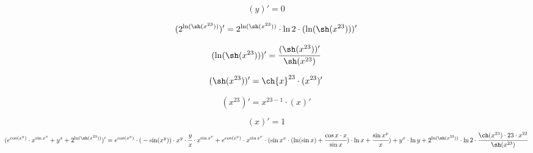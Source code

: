

\begin{dmath}
( y )' = 0
\end{dmath}




\begin{dmath}
({ 2 } ^ { \ln ( \sh ({ x } ^ { 23 }))})' = { 2 } ^ { \ln ( \sh ({ x } ^ { 23 }))} \cdot  \ln  2  \cdot ( \ln ( \sh ({ x } ^ { 23 })))'
\end{dmath}




\begin{dmath}
( \ln ( \sh ({ x } ^ { 23 })))' =  \cfrac {( \sh ({ x } ^ { 23 }))'}{ \sh ({ x } ^ { 23 })}
\end{dmath}




\begin{dmath}
( \sh ({ x } ^ { 23 }))' =  \ch { x } ^ { 23 } \cdot ({ x } ^ { 23 })'
\end{dmath}




\begin{dmath}
({ x } ^ { 23 })' = { x  ^ { 23  - 1} \cdot ( x )'}
\end{dmath}




\begin{dmath}
( x )' = 1
\end{dmath}
\begin{dmath}
({{{{ e } ^ { \cos ({ x } ^ { y })}} \cdot {{ x } ^ {{ \sin  x } ^ { x }}}} + {{ y } ^ { x }}} + {{ 2 } ^ { \ln ( \sh ({ x } ^ { 23 }))}})' = {{{{{{ e } ^ { \cos ({ x } ^ { y })}} \cdot {{({} - { \sin ({ x } ^ { y })})} \cdot {{{ x } ^ { y }} \cdot { \cfrac { y }{ x }}}}} \cdot {{ x } ^ {{ \sin  x } ^ { x }}}} + {{{ e } ^ { \cos ({ x } ^ { y })}} \cdot {{{ x } ^ {{ \sin  x } ^ { x }}} \cdot {({{{{ \sin  x } ^ { x }} \cdot {({ \ln ( \sin  x )} + { \cfrac {{ \cos  x } \cdot { x }}{ \sin  x }})}} \cdot { \ln  x }} + { \cfrac {{ \sin  x } ^ { x }}{ x }})}}}} + {{{ y } ^ { x }} \cdot { \ln  y }}} + {{{ 2 } ^ { \ln ( \sh ({ x } ^ { 23 }))}} \cdot {{ \ln  2 } \cdot { \cfrac {{ \ch ({ x } ^ { 23 })} \cdot {{ 23 } \cdot {{ x } ^ { 22 }}}}{ \sh ({ x } ^ { 23 })}}}}
\end{dmath}


